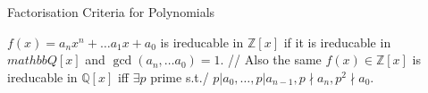 
    \begin{subsubsection}{Factorisation Criteria for Polynomials}

      \(f(x) = a_{n}x^{n} + \dots a_{1}x + a_{0}\) is ireducable in
      \(\mathbb{Z}[x]\) if it is ireducable in \(mathbb{Q}[x]\) and
      \(\gcd(a_{n}, \dots a_{0}) = 1\). //
      Also the same \(f(x) \in \mathbb{Z}[x]\) is ireducable in \(\mathbb{Q}[x]\)
      iff \(\exists p\) prime s.t./ \(p | a_{0}, \dots , p | a_{n - 1}, p \nmid
      a_{n}, p^{2} \nmid a_{0}\).

    \end{subsubsection}
